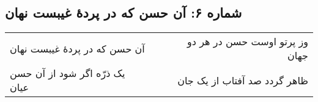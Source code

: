 \begin{center}
\section*{شماره ۶: آن حسن که در پردۀ غیبست نهان}
\label{sec:006}
\begin{longtable}{l p{0.5cm} r}
آن حسن که در پردهٔ غیبست نهان
&&
وز پرتو اوست حسن در هر دو جهان
\\
یک ذرّه اگر شود از آن حسن عیان
&&
ظاهر گردد صد آفتاب از یک جان
\\
\end{longtable}
\end{center}
